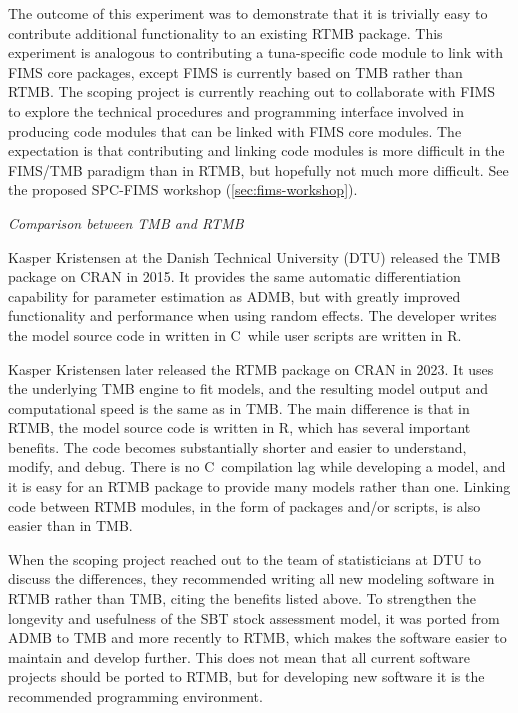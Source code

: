 \documentclass{SCreport}
\newcommand\cpp{\mbox{C\raisebox{0.5ex}{\tiny\bfseries ++}}}
\begin{document}
The outcome of this experiment was to demonstrate that it is trivially easy to
contribute additional functionality to an existing RTMB package. This experiment
is analogous to contributing a tuna-specific code module to link with FIMS core
packages, except FIMS is currently based on TMB rather than RTMB. The scoping
project is currently reaching out to collaborate with FIMS to explore the
technical procedures and programming interface involved in producing code
modules that can be linked with FIMS core modules. The expectation is that
contributing and linking code modules is more difficult in the FIMS/TMB paradigm
than in RTMB, but hopefully not much more difficult. See the proposed SPC-FIMS
workshop (\autoref{sec:fims-workshop}).

\vspace{2ex}

\textit{Comparison between TMB and RTMB}

Kasper Kristensen at the Danish Technical University (DTU) released the TMB
package on CRAN in 2015. It provides the same automatic differentiation
capability for parameter estimation as ADMB, but with greatly improved
functionality and performance when using random effects. The developer writes
the model source code in written in \cpp\, while user scripts are written in R.

Kasper Kristensen later released the RTMB package on CRAN in 2023. It uses the
underlying TMB engine to fit models, and the resulting model output and
computational speed is the same as in TMB. The main difference is that in RTMB,
the model source code is written in R, which has several important benefits. The
code becomes substantially shorter and easier to understand, modify, and debug.
There is no \cpp\ compilation lag while developing a model, and it is easy for
an RTMB package to provide many models rather than one. Linking code between
RTMB modules, in the form of packages and/or scripts, is also easier than in
TMB.

When the scoping project reached out to the team of statisticians at DTU to
discuss the differences, they recommended writing all new modeling software in
RTMB rather than TMB, citing the benefits listed above. To strengthen the
longevity and usefulness of the SBT stock assessment model, it was ported from
ADMB to TMB and more recently to RTMB, which makes the software easier to
maintain and develop further. This does not mean that all current software
projects should be ported to RTMB, but for developing new software it is the
recommended programming environment.
\end{document}
